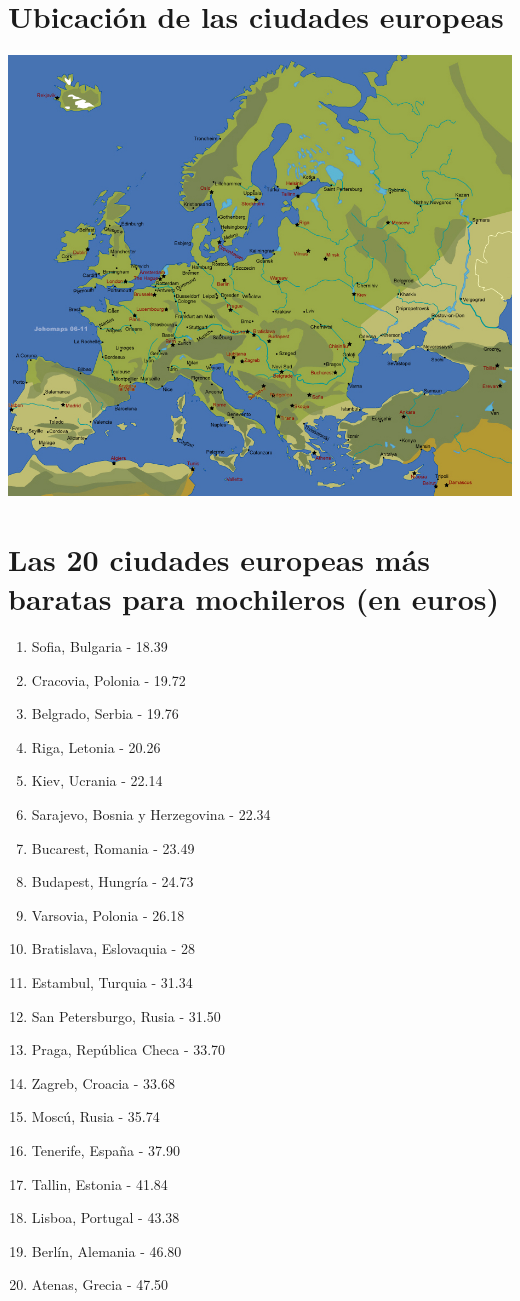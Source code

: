 \documentclass[10pt,letterpaper,oneside]{book}
\begin{document}
\appendix
\chapter{Ubicación de las ciudades europeas}

\includegraphics[scale=0.4]{europecities}

\backmatter
\chapter{Las 20 ciudades europeas más baratas para mochileros (en euros)}

\begin{enumerate}
	\item Sofia, Bulgaria - 18.39
	\item Cracovia, Polonia - 19.72
	\item Belgrado, Serbia - 19.76
	\item Riga, Letonia - 20.26
	\item Kiev, Ucrania - 22.14
	\item Sarajevo, Bosnia y Herzegovina - 22.34
	\item Bucarest, Romania - 23.49
	\item Budapest, Hungría - 24.73
	\item Varsovia, Polonia - 26.18
	\item Bratislava, Eslovaquia - 28
	\item Estambul, Turquia - 31.34
	\item San Petersburgo, Rusia - 31.50
	\item Praga, República Checa - 33.70
	\item Zagreb, Croacia - 33.68
	\item Moscú, Rusia - 35.74
	\item Tenerife, España - 37.90
	\item Tallin, Estonia - 41.84
	\item Lisboa, Portugal - 43.38
	\item Berlín, Alemania - 46.80
	\item Atenas, Grecia - 47.50
\end{enumerate}
\end{document}
